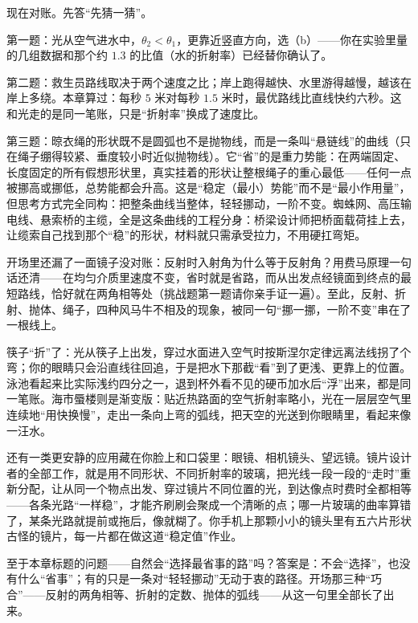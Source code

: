 
现在对账。先答“先猜一猜”。

第一题：光从空气进水中，\(\theta_2<\theta_1\)，更靠近竖直方向，选（b）——你在实验里量的几组数据和那个约 \(1.3\) 的比值（水的折射率）已经替你确认了。

第二题：救生员路线取决于两个速度之比；岸上跑得越快、水里游得越慢，越该在岸上多绕。本章算过：每秒 \(5\) 米对每秒 \(1.5\) 米时，最优路线比直线快约六秒。这和光走的是同一笔账，只是“折射率”换成了速度比。

第三题：晾衣绳的形状既不是圆弧也不是抛物线，而是一条叫“悬链线”的曲线（只在绳子绷得较紧、垂度较小时近似抛物线）。它“省”的是重力势能：在两端固定、长度固定的所有假想形状里，真实挂着的形状让整根绳子的重心最低——任何一点被挪高或挪低，总势能都会升高。这是“稳定（最小）势能”而不是“最小作用量”，但思考方式完全同构：把整条曲线当整体，轻轻挪动，一阶不变。蜘蛛网、高压输电线、悬索桥的主缆，全是这条曲线的工程分身：桥梁设计师把桥面载荷挂上去，让缆索自己找到那个“稳”的形状，材料就只需承受拉力，不用硬扛弯矩。

开场里还漏了一面镜子没对账：反射时入射角为什么等于反射角？用费马原理一句话还清——在均匀介质里速度不变，省时就是省路，而从出发点经镜面到终点的最短路线，恰好就在两角相等处（挑战题第一题请你亲手证一遍）。至此，反射、折射、抛体、绳子，四种风马牛不相及的现象，被同一句“挪一挪，一阶不变”串在了一根线上。

筷子“折”了：光从筷子上出发，穿过水面进入空气时按斯涅尔定律远离法线拐了个弯；你的眼睛只会沿直线往回追，于是把水下那截“看”到了更浅、更靠上的位置。泳池看起来比实际浅约四分之一，退到杯外看不见的硬币加水后“浮”出来，都是同一笔账。海市蜃楼则是渐变版：贴近热路面的空气折射率略小，光在一层层空气里连续地“用快换慢”，走出一条向上弯的弧线，把天空的光送到你眼睛里，看起来像一汪水。

还有一类更安静的应用藏在你脸上和口袋里：眼镜、相机镜头、望远镜。镜片设计者的全部工作，就是用不同形状、不同折射率的玻璃，把光线一段一段的“走时”重新分配，让从同一个物点出发、穿过镜片不同位置的光，到达像点时费时全都相等——各条光路“一样稳”，才能齐刷刷会聚成一个清晰的点；哪一片玻璃的曲率算错了，某条光路就提前或拖后，像就糊了。你手机上那颗小小的镜头里有五六片形状古怪的镜片，每一片都在做这道“稳定值”作业。

至于本章标题的问题——自然会“选择最省事的路”吗？答案是：不会“选择”，也没有什么“省事”；有的只是一条对“轻轻挪动”无动于衷的路径。开场那三种“巧合”——反射的两角相等、折射的定数、抛体的弧线——从这一句里全部长了出来。


